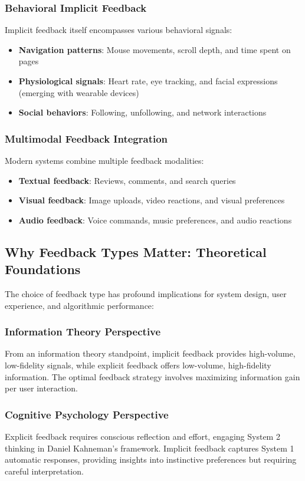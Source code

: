 \documentclass[acmsmall,review,anonymous]{acmart}
\begin{document}
\subsubsection{Behavioral Implicit Feedback}
Implicit feedback itself encompasses various behavioral signals:
\begin{itemize}
    \item \textbf{Navigation patterns}: Mouse movements, scroll depth, and time spent on pages
    \item \textbf{Physiological signals}: Heart rate, eye tracking, and facial expressions (emerging with wearable devices)
    \item \textbf{Social behaviors}: Following, unfollowing, and network interactions
\end{itemize}

\subsubsection{Multimodal Feedback Integration}
Modern systems combine multiple feedback modalities:
\begin{itemize}
    \item \textbf{Textual feedback}: Reviews, comments, and search queries
    \item \textbf{Visual feedback}: Image uploads, video reactions, and visual preferences
    \item \textbf{Audio feedback}: Voice commands, music preferences, and audio reactions
\end{itemize}

\subsection{Why Feedback Types Matter: Theoretical Foundations}

The choice of feedback type has profound implications for system design, user experience, and algorithmic performance:

\subsubsection{Information Theory Perspective}
From an information theory standpoint, implicit feedback provides high-volume, low-fidelity signals, while explicit feedback offers low-volume, high-fidelity information. The optimal feedback strategy involves maximizing information gain per user interaction.

\subsubsection{Cognitive Psychology Perspective}
Explicit feedback requires conscious reflection and effort, engaging System 2 thinking in Daniel Kahneman's framework. Implicit feedback captures System 1 automatic responses, providing insights into instinctive preferences but requiring careful interpretation.
\end{document}
